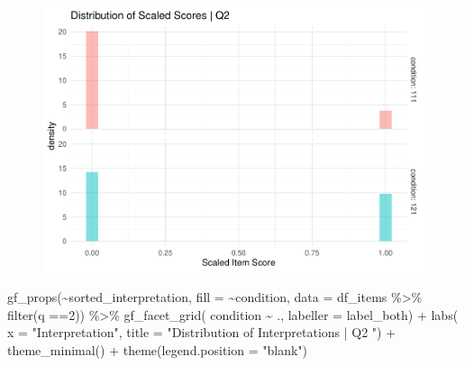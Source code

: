 \documentclass[
  letterpaper,
  DIV=11,
  numbers=noendperiod]{scrreprt}
\newenvironment{Shaded}{\begin{snugshade}}{\end{snugshade}}
\newcommand{\AttributeTok}[1]{\textcolor[rgb]{0.40,0.45,0.13}{#1}}
\newcommand{\DecValTok}[1]{\textcolor[rgb]{0.68,0.00,0.00}{#1}}
\newcommand{\FunctionTok}[1]{\textcolor[rgb]{0.28,0.35,0.67}{#1}}
\newcommand{\NormalTok}[1]{\textcolor[rgb]{0.00,0.23,0.31}{#1}}
\newcommand{\SpecialCharTok}[1]{\textcolor[rgb]{0.37,0.37,0.37}{#1}}
\newcommand{\StringTok}[1]{\textcolor[rgb]{0.13,0.47,0.30}{#1}}
\begin{document}
\begin{figure}[H]

{\centering \includegraphics{analysis/SGC3A/2_sgc3A_scoring_files/figure-pdf/Q2-distribution-1.pdf}

}

\end{figure}

\begin{Shaded}
\begin{Highlighting}[]
\FunctionTok{gf\_props}\NormalTok{(}\SpecialCharTok{\textasciitilde{}}\NormalTok{sorted\_interpretation, }\AttributeTok{fill =} \SpecialCharTok{\textasciitilde{}}\NormalTok{condition, }\AttributeTok{data =}\NormalTok{ df\_items }\SpecialCharTok{\%\textgreater{}\%} \FunctionTok{filter}\NormalTok{(q }\SpecialCharTok{==}\DecValTok{2}\NormalTok{)) }\SpecialCharTok{\%\textgreater{}\%} 
  \FunctionTok{gf\_facet\_grid}\NormalTok{( condition }\SpecialCharTok{\textasciitilde{}}\NormalTok{ ., }\AttributeTok{labeller =}\NormalTok{ label\_both) }\SpecialCharTok{+} 
  \FunctionTok{labs}\NormalTok{( }\AttributeTok{x =} \StringTok{"Interpretation"}\NormalTok{, }\AttributeTok{title =} \StringTok{"Distribution of Interpretations | Q2 "}\NormalTok{) }\SpecialCharTok{+} 
  \FunctionTok{theme\_minimal}\NormalTok{() }\SpecialCharTok{+} \FunctionTok{theme}\NormalTok{(}\AttributeTok{legend.position =} \StringTok{"blank"}\NormalTok{)}
\end{Highlighting}
\end{Shaded}
\end{document}
